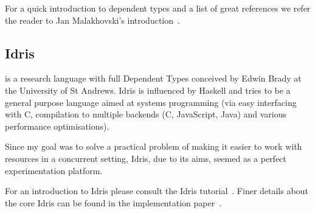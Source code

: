 For a quick introduction to dependent types and a list of great references we
refer the reader to Jan Malakhovski's introduction~\cite{deptypes-intro}.

\subsection{Idris}

\Idris{} is a research language with full Dependent Types conceived by Edwin
Brady at the University of St Andrews. Idris is influenced by Haskell and tries
to be a general purpose language aimed at systems programming (via easy
interfacing with C, compilation to multiple backends (C, JavaScript, Java) and
various performance optimisations).

Since my goal was to solve a practical problem of making it easier to work with
resources in a concurrent setting, Idris, due to its aims, seemed as a perfect
experimentation platform.

For an introduction to Idris please consult the Idris
tutorial~\cite{idris-tutorial}. Finer details about the core Idris can be found
in the implementation paper~\cite{idris-impl}.

